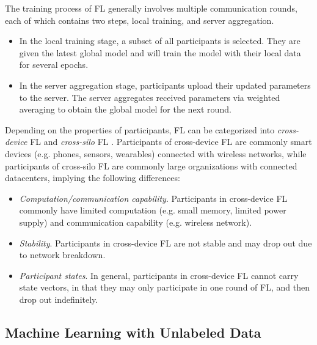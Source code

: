 \documentclass[11pt]{article}
\begin{document}
The training process of FL generally involves multiple communication rounds, each of which contains two steps, local training, and server aggregation.
\begin{itemize}
    \item In the local training stage, a subset of all participants is selected. They are given the latest global model and will train the model with their local data for several epochs.

    \item In the server aggregation stage, participants upload their updated parameters to the server. The server aggregates received parameters via weighted averaging to obtain the global model for the next round.
\end{itemize}

Depending on the properties of participants, FL can be categorized into \textit{cross-device} FL and \textit{cross-silo} FL \cite{Yilun-kairouz2021advances}. Participants of cross-device FL are commonly smart devices (e.g. phones, sensors, wearables) connected with wireless networks, while participants of cross-silo FL are commonly large organizations with connected datacenters, implying the following differences:
\begin{itemize}
    \item \textit{Computation/communication capability}. Participants in cross-device FL commonly have limited computation (e.g. small memory, limited power supply) and communication capability (e.g. wireless network).
    \item \textit{Stability}. Participants in cross-device FL are not stable and may drop out due to network breakdown.
    \item \textit{Participant states}. In general, participants in cross-device FL cannot carry state vectors, in that they may only participate in one round of FL, and then drop out indefinitely.
\end{itemize}


\subsection{Machine Learning with Unlabeled Data}
\end{document}
